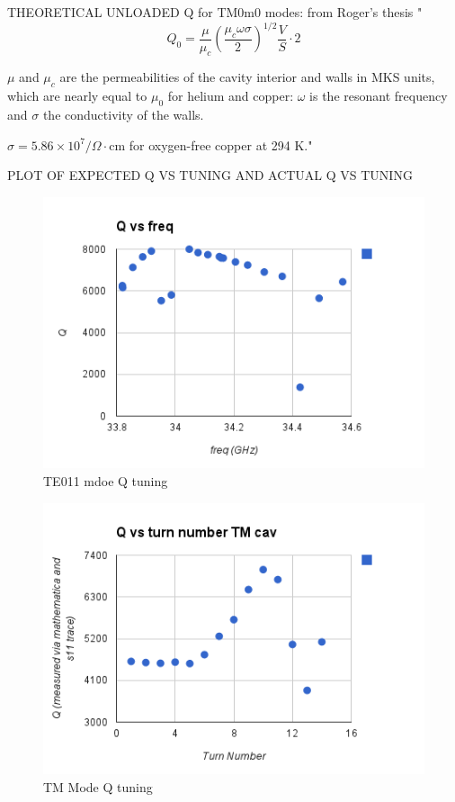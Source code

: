 \documentclass[11pt]{article}
\begin{document}
THEORETICAL UNLOADED Q for TM0m0 modes: from Roger's thesis
"
$$Q_0 = \frac{\mu}{\mu_c} (\frac{\mu_c \omega \sigma}{2})^{1/2} \frac{V}{S} \cdot 2 $$

$\mu$ and $\mu_c$ are the permeabilities of the cavity interior and walls in MKS units, which are nearly equal to $\mu_0$ for helium and copper: $\omega$ is the resonant frequency and $\sigma$ the conductivity of the walls.

$\sigma = 5.86 \times 10^{7}/\Omega\cdot\text{cm}$ for oxygen-free copper at 294 K."

PLOT OF EXPECTED Q VS TUNING AND ACTUAL Q VS TUNING
\begin{figure}
\includegraphics[scale=0.7]{Q_vs_freq}
\caption{TE011 mdoe Q tuning}
\end{figure}

\begin{figure}
\includegraphics[scale=0.7]{TM_cav_Q_vs_turn_number}
\caption{TM Mode Q tuning}
\end{figure}
\end{document}
